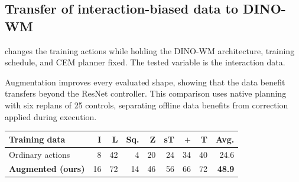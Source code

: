 \begin{table}[!t]
\begin{minipage}[t]{\columnwidth}
\subsection{Transfer of interaction-biased data to DINO-WM}
\label{sec:dinowm}
 changes the training actions while holding the DINO-WM architecture, training schedule, and CEM planner fixed. The tested variable is the interaction data.\par\smallskip
\normalsize
Augmentation improves every evaluated shape, showing that the data benefit transfers beyond the ResNet controller. This comparison uses native planning with six replans of 25 controls, separating offline data benefits from correction applied during execution.\par
\end{minipage}\hfill
\begin{minipage}[t]{\columnwidth}
\vspace{0pt}
\par\smallskip
{\centering
\centering
{}
\label{tab:dinowm-aug}
\small
\setlength{\tabcolsep}{3.4pt}
\begin{tabular}{lrrrrrrrr}
\toprule
Training data & I & L & Sq. & Z & sT & $+$ & T & Avg.\\
\midrule
Ordinary actions &8&42&4&20&24&34&40&24.6\\
\textbf{Augmented (ours)} &16&72&14&46&56&66&72&\textbf{48.9}\\
\bottomrule
\end{tabular}
\par}
\end{minipage}\par

\end{table}
\clearpage
